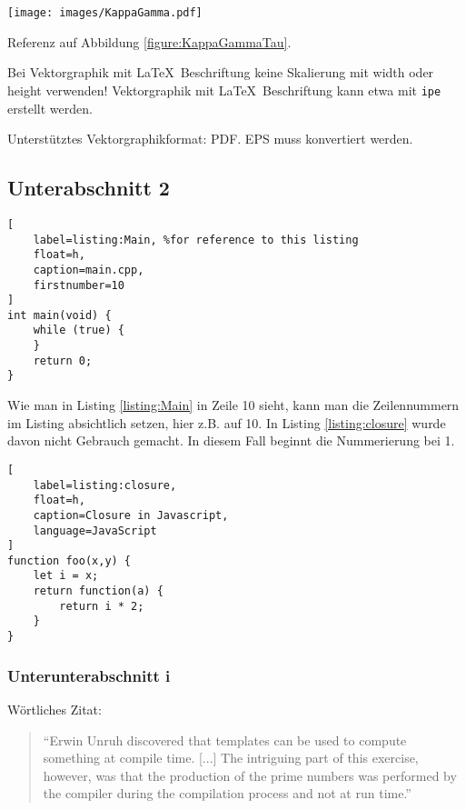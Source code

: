 \begin{figure*}[t]
	\centering
	\texttt{[image: images/KappaGamma.pdf]}
	\caption{
		Vektorgraphik mit \LaTeX\ Beschriftung ($\kappa$, $\gamma$)
	}
	\label{figure:KappaGammaTau}
\end{figure*}

Referenz auf Abbildung \ref{figure:KappaGammaTau}.

Bei Vektorgraphik mit \LaTeX\ Beschriftung keine Skalierung mit width
oder height verwenden!
Vektorgraphik mit \LaTeX\ Beschriftung kann etwa mit \texttt{ipe} erstellt
werden.

Unterstütztes Vektorgraphikformat: PDF. EPS muss konvertiert werden.


\subsection{Unterabschnitt 2}
\label{subsection:Coding}

\begin{lstlisting}[
	label=listing:Main, %for reference to this listing
	float=h,
	caption=main.cpp,
	firstnumber=10
]
int main(void) {
	while (true) {
	}
	return 0;
}
\end{lstlisting}

Wie man in Listing \ref{listing:Main} in Zeile 10 sieht, kann man die Zeilennummern im Listing absichtlich setzen, hier z.B. auf 10. In Listing \ref{listing:closure} wurde davon nicht Gebrauch gemacht. In diesem Fall beginnt die Nummerierung bei 1.

\begin{lstlisting}[
    label=listing:closure,
	float=h,
	caption=Closure in Javascript,
	language=JavaScript
]
function foo(x,y) {
    let i = x;
    return function(a) {
        return i * 2;
    }
}
\end{lstlisting}


\subsubsection{Unterunterabschnitt i}

Wörtliches Zitat:
\begin{quote}
``Erwin Unruh discovered that templates can be used to compute
something at compile time. [...] The intriguing part of this exercise, however, was that the production of the prime numbers was performed by the compiler during the compilation process and not at run time.''

\autocite[305]{Bosch2014}
\end{quote}
\selectthesislanguage


